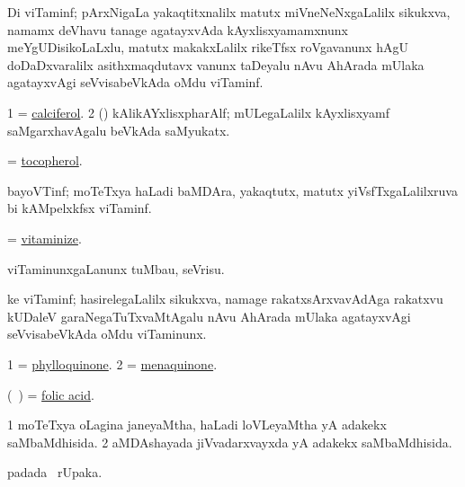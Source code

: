 \bentry
{}
\gl{\nA}
\expl{}
\bmng
Di viTaminf; pArxNigaLa yakaqtitxnalilx matutx miVneNeNxgaLalilx sikukxva, namamx deVhavu tanage agatayxvAda kAyxlisxyamamxnunx meYgUDisikoLaLxlu, matutx makakxLalilx rikeTfsx roVgavanunx hAgU doDaDxvaralilx asithxmaqdutavx  vanunx taDeyalu nAvu AhArada mUlaka agatayxvAgi seVvisabeVkAda oMdu viTaminf. 
\emng

\noindent 
\gl{\pagu}
\expl{}
\bmng
\bnum
\num{1} = \hyperref{kandict_c.pdf}{C}{calciferol}{calciferol}. 
\num{2} (\jiVra) kAlikAYxlisxpharAlf; mULegaLalilx kAyxlisxyamf saMgarxhavAgalu beVkAda saMyukatx. 
\enum
\emng
\eentry

\bentry
{}
\gl{\nA}
\expl{}
\bmng
 = \hyperref{kandict_t.pdf}{T}{tocopherol}{tocopherol}. 
\emng
\eentry

\bentry
{}
\gl{\nA}
\expl{}
\bmng
 bayoVTinf; moTeTxya haLadi baMDAra, yakaqtutx, matutx yiVsfTxgaLalilxruva bi kAMpelxkfsx viTaminf. 
\emng
\eentry

\bentry
{} 
\gl{\sakirx}
\expl{}
\bmng
 = \hyperlink{vitaminize}{vitaminize}. 
\emng
\eentry

\bentry
{} 
\gl{\sakirx}
\expl{}
\bmng
 viTaminunxgaLanunx tuMbau, seVrisu. 
\emng
\eentry

\bentry
{}
\gl{\nA}
\expl{}
\bmng
 ke viTaminf; hasirelegaLalilx sikukxva, namage rakatxsArxvavAdAga rakatxvu kUDaleV garaNegaTuTxvaMtAgalu nAvu AhArada mUlaka agatayxvAgi seVvisabeVkAda oMdu viTaminunx. 
\emng

\noindent 
\gl{\pagu}
\expl{}
\bmng
\bnum
\num{1} = \hyperref{kandict_p.pdf}{P}{phylloquinone}{phylloquinone}. 
\num{2} = \hyperref{kandict_m.pdf}{M}{menaquinone}{menaquinone}. 
\enum
\emng
\eentry

\bentry
{}
\gl{\nA}
\expl{}
\bmng
 (\kanmu\ \ame) = \hyperref{kandict_f.pdf}{F}{folic acid}{folic acid}. 
\emng
\eentry

\bentry
{} 
\gl{\gu}
\expl{}
\bmng
\bnum
\num{1} moTeTxya oLagina janeyaMtha, haLadi loVLeyaMtha yA adakekx saMbaMdhisida. 
\num{2} aMDAshayada jiVvadarxvayxda yA adakekx saMbaMdhisida. 
\enum
\emng
\eentry

\bentry 
{} 
\gl{\nA}
\expl{}
\bmng
  padada \bava\ rUpaka. 
\emng
\eentry

